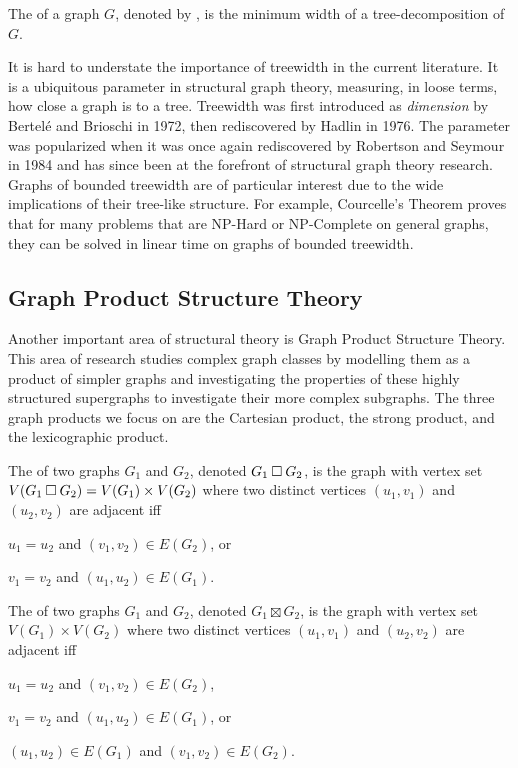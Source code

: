 \documentclass[../main.tex]{subfiles}
\begin{document}
The  of a graph $G$, denoted by , is the minimum width of a tree-decomposition of $G$.

It is hard to understate the importance of treewidth in the current literature.
It is a ubiquitous parameter in structural graph theory, measuring, in loose terms, how close a graph is to a tree. 
Treewidth was first introduced as \textit{dimension} by  Bertel\'e  and Brioschi \cite[pp.~37--38]{BB1972} in 1972, then rediscovered by Hadlin \cite{Halin76} in 1976.
The parameter was popularized when it was once again rediscovered by Robertson and Seymour \cite{ROBERTSON198449} in 1984 and has since been at the forefront of structural graph theory research. Graphs of bounded treewidth are of particular interest due to the wide implications of their tree-like structure. For example, Courcelle's Theorem \cite{Courcelle90} proves that for many problems that are NP-Hard or NP-Complete on general graphs, they can be solved in linear time on graphs of bounded treewidth.

\subsection{Graph Product Structure Theory}
Another important area of structural theory is Graph Product Structure Theory. This area of research studies complex graph classes by modelling them as a product of simpler graphs and investigating the properties of these highly structured supergraphs to investigate their more complex subgraphs. The three graph products we focus on are the Cartesian product, the strong product, and the lexicographic product.

The  of two graphs $G_1$ and $G_2$, denoted $G_1 \mathbin{\Box} G_2$, is the graph with vertex set $V(G_1 \mathbin{\Box} G_2) = V(G_1) \times V(G_2)$ where two distinct vertices $(u_1, v_1)$ and $(u_2, v_2)$ are adjacent iff 
\begin{compactitem}
	\item $u_1 = u_2$ and $(v_1, v_2) \in E(G_2)$, or
	\item $v_1 = v_2$ and $(u_1, u_2) \in E(G_1)$.
\end{compactitem}

The  of two graphs $G_1$ and $G_2$, denoted $G_1 \boxtimes G_2$, is the graph with vertex set $V(G_1) \times V(G_2)$ where two distinct vertices $(u_1, v_1)$ and $(u_2, v_2)$ are adjacent iff 
\begin{compactitem}
	\item $u_1 = u_2$ and $(v_1, v_2) \in E(G_2)$, 
	\item $v_1 = v_2$ and $(u_1, u_2) \in E(G_1)$, or
	\item $(u_1, u_2) \in E(G_1)$ and $(v_1, v_2) \in E(G_2)$.
\end{compactitem}
\end{document}
